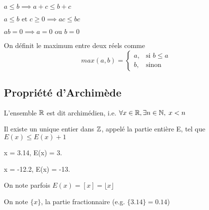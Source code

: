 \documentclass[a4paper, 12pt]{article}
\begin{document}
\begin{proprietes}
    \item $a \leq b \implies a + c \leq b + c$
    \item $a \leq b \text{ et } c \geq 0 \implies ac \leq bc$
    \item $ab = 0 \implies a = 0 \text{ ou } b = 0$
\end{proprietes}

On définit le maximum entre deux réels comme
\begin{equation}
    max(a, b) =
    \begin{cases}
        a, & \text{si } b \leq a \\
        b, & \text{sinon}
    \end{cases}
\end{equation}

\subsection{Propriété d'Archimède}

L'ensemble $\mathbb{R}$ est dit archimédien, i.e. $\forall x \in \mathbb{R}, \exists n \in \mathbb{N}, \; x < n$

\begin{definition}
    Il existe un unique entier dans $\mathbb{Z}$, appelé la partie entière E, tel que $E(x) \leq E(x) + 1$
\end{definition}

\begin{example}
    \item x = 3.14, E(x) = 3.
    \item x = -12.2, E(x) = -13.
\end{example}

\begin{remark}
    \item On note parfois $E(x) = [x] = \lfloor x \rfloor$
    \item On note $\{x\}$, la partie fractionnaire (e.g. $\{3.14\}=0.14$)
\end{remark}
\end{document}
